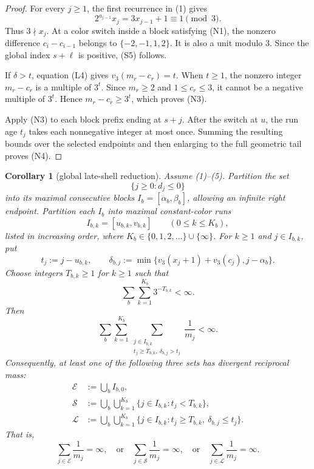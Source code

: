 \documentclass[11pt]{article}
\newtheorem{corollary}[theorem]{Corollary}
\begin{document}
\begin{proof}
For every $j\geq1$, the first recurrence in (1) gives
\[
  2^{a_{j-1}}x_j=3x_{j-1}+1\equiv1\pmod3.
\]
Thus $3\nmid x_j$.  At a color switch inside a block satisfying (N1), the
nonzero difference $c_i-c_{i-1}$ belongs to
$\{-2,-1,1,2\}$.  It is also a unit modulo $3$.  Since the global index
$s+\ell$ is positive, (S5) follows.

If $\delta>t$, equation (L4) gives $v_3(m_r-c_r)=t$.  When $t\geq1$, the
nonzero integer $m_r-c_r$ is a multiple of $3^t$.  Since $m_r\geq2$ and
$1\leq c_r\leq3$, it cannot be a negative multiple of $3^t$.  Hence
$m_r-c_r\geq3^t$, which proves (N3).

Apply (N3) to each block prefix ending at $s+j$.  After the switch at $u$,
the run age $t_j$ takes each nonnegative integer at most once.  Summing the
resulting bounds over the selected endpoints and then enlarging to the full
geometric tail proves (N4).
\end{proof}

\begin{corollary}[global late-shell reduction]
Assume (1)--(5).  Partition the set
\[
  \{j\geq0:d_j\leq0\}
\]
into its maximal consecutive blocks $I_b=[\alpha_b,\beta_b]$, allowing an
infinite right endpoint.  Partition each $I_b$ into maximal constant-color
runs
\[
  I_{b,k}=[u_{b,k},v_{b,k}]
  \qquad(0\leq k\leq K_b),
\]
listed in increasing order, where $K_b\in\{0,1,2,\ldots\}\cup\{\infty\}$.
For $k\geq1$ and $j\in I_{b,k}$, put
\[
  t_j:=j-u_{b,k},
  \qquad
  \delta_{b,j}:=
  \min\{v_3(x_j+1)+v_3(c_j),j-\alpha_b\}.
  \tag{G1}
\]
Choose integers $T_{b,k}\geq1$ for $k\geq1$ such that
\[
  \sum_b\sum_{k=1}^{K_b}3^{-T_{b,k}}<\infty.
  \tag{G2}
\]
Then
\[
\boxed{
  \sum_b\sum_{k=1}^{K_b}
  \sum_{\substack{j\in I_{b,k}\\
                   t_j\geq T_{b,k},\ \delta_{b,j}>t_j}}
  \frac1{m_j}<\infty.}
\tag{G3}
\]
Consequently, at least one of the following three sets has divergent
reciprocal mass:
\[
\begin{aligned}
  \mathcal E
  &:=\bigcup_b I_{b,0},\\
  \mathcal S
  &:=\bigcup_b\bigcup_{k=1}^{K_b}
    \{j\in I_{b,k}:t_j<T_{b,k}\},\\
  \mathcal L
  &:=\bigcup_b\bigcup_{k=1}^{K_b}
    \{j\in I_{b,k}:t_j\geq T_{b,k},\ \delta_{b,j}\leq t_j\}.
\end{aligned}
\tag{G4}
\]
That is,
\[
\boxed{
  \sum_{j\in\mathcal E}\frac1{m_j}=\infty,
  \quad\text{or}\quad
  \sum_{j\in\mathcal S}\frac1{m_j}=\infty,
  \quad\text{or}\quad
  \sum_{j\in\mathcal L}\frac1{m_j}=\infty.}
\tag{G5}
\]
\end{corollary}
\end{document}
